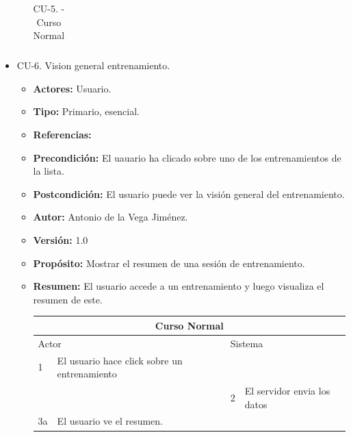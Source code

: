 \begin{itemize}
\begin{itemize}
\begin{table}[H]
\begin{tabularx}{\textwidth}{|l|X|l|X|}
      \end{tabularx}
      \caption{CU-5. - Curso Normal}
      \label{my-label}
    \end{table}
  \end{itemize}
  \item CU-6. Vision general entrenamiento.
  \begin{itemize}
    \item \textbf{Actores:} Usuario.
    \item \textbf{Tipo:} Primario, esencial.
    \item \textbf{Referencias:}
    \item \textbf{Precondición:} El uauario ha clicado sobre uno de los entrenamientos de la lista.
    \item \textbf{Postcondición:} El usuario puede ver la visión general del entrenamiento.
    \item \textbf{Autor:} Antonio de la Vega Jiménez.
    \item \textbf{Versión:} 1.0
    \item \textbf{Propósito:} Mostrar el resumen de una sesión de entrenamiento.
    \item \textbf{Resumen:} El usuario accede a un entrenamiento y luego visualiza el resumen de este.
    \begin{table}[H]
      \centering
      \begin{tabularx}{\textwidth}{|l|X|l|X|}
        \hline
        \multicolumn{4}{|c|}{\cellcolor[HTML]{C0C0C0}Curso Normal}                                                 \\ \hline
        \multicolumn{2}{|l|}{\cellcolor[HTML]{EFEFEF}Actor} & \multicolumn{2}{l|}{\cellcolor[HTML]{EFEFEF}Sistema} \\ \hline
        1                         & El usuario hace click sobre un entrenamiento                       &                            &                         \\ \hline
                                  &                         & 2                          & El servidor envia los datos                     \\ \hline
        3a                         & El usuario ve el resumen.      &                          &                        \\ \hline
                                  

\end{tabularx}
\end{table}
\end{itemize}
\end{itemize}
